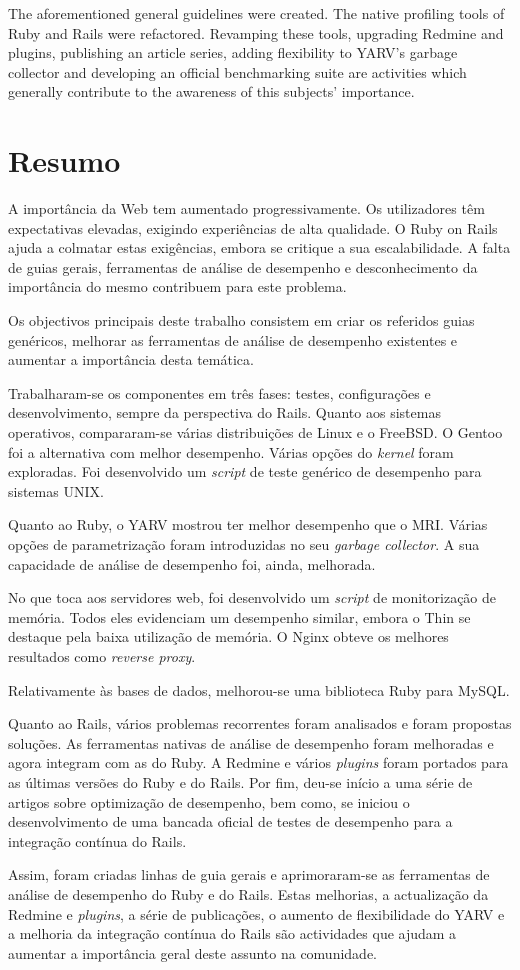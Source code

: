 The aforementioned general guidelines were created. The native profiling tools of Ruby and Rails were refactored. Revamping these tools, upgrading Redmine and plugins, publishing an article series, adding flexibility to YARV's garbage collector and developing an official benchmarking suite are activities which generally contribute to the awareness of this subjects' importance.


\chapter*{Resumo}
A importância da Web tem aumentado progressivamente. Os utilizadores têm expectativas elevadas, exigindo experiências de alta qualidade. O Ruby on Rails ajuda a colmatar estas exigências, embora se critique a sua escalabilidade. A falta de guias gerais, ferramentas de análise de desempenho e desconhecimento da importância do mesmo contribuem para este problema.

Os objectivos principais deste trabalho consistem em criar os referidos guias genéricos, melhorar as ferramentas de análise de desempenho existentes e aumentar a importância desta temática.

Trabalharam-se os componentes em três fases: testes, configurações e desenvolvimento, sempre da perspectiva do Rails. Quanto aos sistemas operativos, compararam-se várias distribuições de Linux e o FreeBSD. O Gentoo foi a alternativa com melhor desempenho. Várias opções do \textit{kernel} foram exploradas. Foi desenvolvido um \textit{script} de teste genérico de desempenho para sistemas UNIX.

Quanto ao Ruby, o YARV mostrou ter melhor desempenho que o MRI. Várias opções de parametrização foram introduzidas no seu \textit{garbage collector}. A sua capacidade de análise de desempenho foi, ainda, melhorada.

No que toca aos servidores web, foi desenvolvido um \textit{script} de monitorização de memória. Todos eles evidenciam um desempenho similar, embora o Thin se destaque pela baixa utilização de memória. O Nginx obteve os melhores resultados como \textit{reverse proxy}.

Relativamente às bases de dados, melhorou-se uma biblioteca Ruby para MySQL.

Quanto ao Rails, vários problemas recorrentes foram analisados e foram propostas soluções. As ferramentas nativas de análise de desempenho foram melhoradas e agora integram com as do Ruby. A Redmine e vários \textit{plugins} foram portados para as últimas versões do Ruby e do Rails. Por fim, deu-se início a uma série de artigos sobre optimização de desempenho, bem como, se iniciou o desenvolvimento de uma bancada oficial de testes de desempenho para a integração contínua do Rails.

Assim, foram criadas linhas de guia gerais e aprimoraram-se as ferramentas de análise de desempenho do Ruby e do Rails. Estas melhorias, a actualização da Redmine e \textit{plugins}, a série de publicações, o aumento de flexibilidade do YARV e a melhoria da integração contínua do Rails são actividades que ajudam a aumentar a importância geral deste assunto na comunidade.
 
